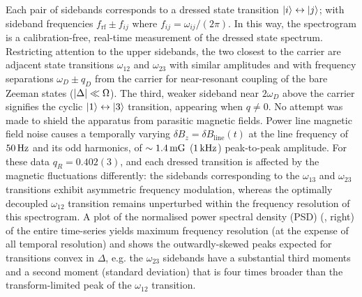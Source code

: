 \documentclass[aps,prl,reprint,superscriptaddress,floatfix]{revtex4-1}
\begin{document}
Each pair of sidebands corresponds to a dressed state transition $\vert i \rangle  \leftrightarrow \vert j \rangle $; with sideband frequencies  $f_{\text{rf}} \pm f_{ij}$ where $f_{ij} = \omega_{ij}/(2\pi)$.
In this way, the spectrogram is a calibration-free, real-time measurement of the dressed state spectrum.
Restricting attention to the upper sidebands, the two closest to the carrier are adjacent state transitions $\omega_{12}$ and $\omega_{23}$ with similar amplitudes and with frequency separations $\omega_D \pm q_D$ from the carrier for near-resonant coupling of the bare Zeeman states ($\vert \Delta \vert  \ll \Omega$).
The third, weaker sideband near $2\omega_D$ above the carrier signifies the cyclic $\vert 1 \rangle  \leftrightarrow \vert 3 \rangle $ transition, appearing when $q\neq 0$.
No attempt was made to shield the apparatus from parasitic magnetic fields.
Power line magnetic field noise causes a temporally varying $\delta B_z = \delta B_{\text{line}}(t)$ at the line frequency of $\unit[50]{Hz}$ and its odd harmonics, of $\sim\unit[1.4]{mG}$ ($\unit[1]{kHz}$) peak-to-peak amplitude.
For these data $q_R = 0.402(3)$, and each dressed transition is affected by the magnetic fluctuations differently: the sidebands corresponding to the $\omega_{13}$ and $\omega_{23}$ transitions exhibit asymmetric frequency modulation, whereas the optimally decoupled $\omega_{12}$ transition remains unperturbed within the frequency resolution of this spectrogram.
A plot of the normalised power spectral density (PSD) (, right) of the entire time-series yields maximum frequency resolution (at the expense of all temporal resolution) and shows the outwardly-skewed peaks expected for transitions convex in $\Delta$, e.g. the $\omega_{23}$ sidebands have a substantial third moments and a second moment (standard deviation) that is four times broader than the transform-limited peak of the $\omega_{12}$ transition.
\end{document}
